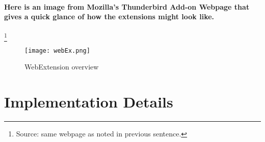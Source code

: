 \paragraph{Here is an image from Mozilla's Thunderbird Add-on Webpage that gives a quick glance of how the extensions might look like.}\footnote{Source: same webpage as noted in previous sentence.}

\begin{figure}[H]
\centering
\texttt{[image: webEx.png]}
\caption{\label{fig: webEx} WebExtension overview}
\end{figure}


\section{Implementation Details}

